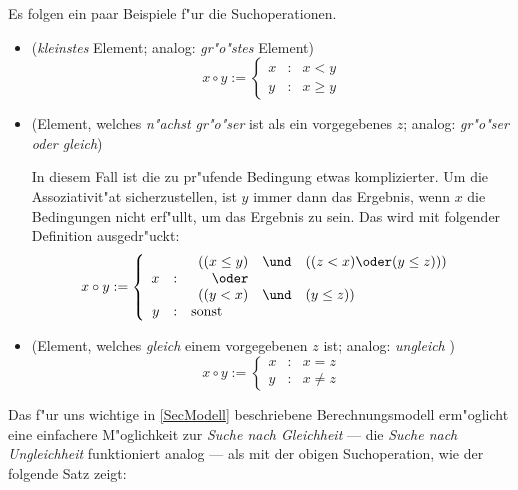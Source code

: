 Es folgen ein paar Beispiele f"ur die Suchoperationen.
\begin{itemize}
\item
     ({\em kleinstes} Element; analog: {\em gr"o"stes} Element)
     \[ x \circ y :=
                 \left\{
                     \begin{array}{lcr}
                         x & : & x < y \\
                         y & : & x \geq y
                     \end{array}
                 \right.
     \]
\item
     (Element, welches {\em n"achst gr"o"ser} ist als ein vorgegebenes $z$;
      analog: {\em gr"o"ser oder gleich})

     In diesem Fall ist die zu pr"ufende Bedingung etwas komplizierter.
     Um die Assoziativit"at sicherzustellen, ist $y$ immer dann das 
     Ergebnis, wenn $x$ die Bedingungen nicht erf"ullt, um das Ergebnis 
     zu sein. Das wird mit folgender Definition ausgedr"uckt:
     \[ x \circ y := \left\{
                     \begin{array}{rcl}
                         x & : & 
                           \begin{array}{rcl}    
                              ((x \leq y) & \und & ((z<x) \oder (y \leq z)))
                           \\ \oder & & 
                           \\ ((y<x) & \und & (y \leq z))
                           \end{array}
                     \\  y & : & \mbox{sonst}
                     \end{array}
                     \right.
     \]
\item
     (Element, welches {\em gleich} einem vorgegebenen $z$ ist;
      analog: {\em ungleich} )
     \[ x \circ y := \left\{
                     \begin{array}{lcr}
                         x & : & x = z \\
                         y & : & x \neq z
                     \end{array}
                 \right.
     \]
\end{itemize}

Das f"ur uns wichtige in \ref{SecModell} beschriebene
Berechnungsmodell erm"oglicht eine einfachere M"oglichkeit zur
{\em Suche nach Gleichheit} --- die {\em Suche nach Ungleichheit}
funktioniert analog --- als mit der obigen Suchoperation, wie der
folgende Satz zeigt:

